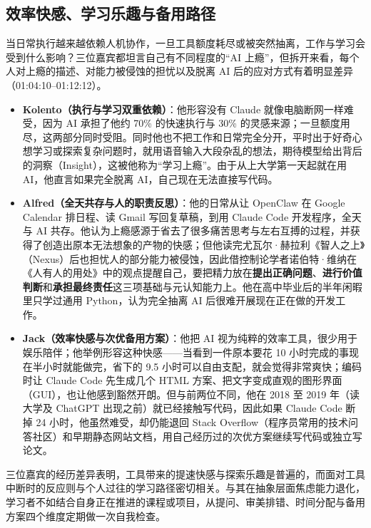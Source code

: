 \documentclass[UTF8,a4paper,11pt,fontset=fandol]{ctexart}
\begin{document}
\subsection{效率快感、学习乐趣与备用路径}
当日常执行越来越依赖人机协作，一旦工具额度耗尽或被突然抽离，工作与学习会受到什么影响？三位嘉宾都坦言自己有不同程度的“AI 上瘾”，但拆开来看，每个人对上瘾的描述、对能力被侵蚀的担忧以及脱离 AI 后的应对方式有着明显差异（01:04:10–01:12:12）。

\begin{itemize}
\item \textbf{Kolento（执行与学习双重依赖）}：他形容没有 Claude 就像电脑断网一样难受，因为 AI 承担了他约 70\% 的快速执行与 30\% 的灵感来源；一旦额度用尽，这两部分同时受阻。同时他也不把工作和日常完全分开，平时出于好奇心想学习或探索复杂问题时，就用语音输入大段杂乱的想法，期待模型给出背后的洞察（Insight），这被他称为“学习上瘾”。由于从上大学第一天起就在用 AI，他直言如果完全脱离 AI，自己现在无法直接写代码。
\item \textbf{Alfred（全天共存与人的职责反思）}：他的日常从让 OpenClaw 在 Google Calendar 排日程、读 Gmail 写回复草稿，到用 Claude Code 开发程序，全天与 AI 共存。他认为上瘾感源于省去了很多痛苦思考与左右互搏的过程，并获得了创造出原本无法想象的产物的快感；但他读完尤瓦尔·赫拉利《智人之上》（Nexus）后也担忧人的部分能力被侵蚀，因此借控制论学者诺伯特·维纳在《人有人的用处》中的观点提醒自己，要把精力放在\textbf{提出正确问题}、\textbf{进行价值判断}和\textbf{承担最终责任}这三项基础与元认知能力上。他在高中毕业后的半年闲暇里只学过通用 Python，认为完全抽离 AI 后很难开展现在正在做的开发工作。
\item \textbf{Jack（效率快感与次优备用方案）}：他把 AI 视为纯粹的效率工具，很少用于娱乐陪伴；他举例形容这种快感——当看到一件原本要花 10 小时完成的事现在半小时就能做完，省下的 9.5 小时可以自由支配，就会觉得非常爽快；编码时让 Claude Code 先生成几个 HTML 方案、把文字变成直观的图形界面（GUI），也让他感到豁然开朗。但与前两位不同，他在 2018 至 2019 年（读大学及 ChatGPT 出现之前）就已经接触写代码，因此如果 Claude Code 断掉 24 小时，他虽然难受，却仍能退回 Stack Overflow（程序员常用的技术问答社区）和早期静态网站文档，用自己经历过的次优方案继续写代码或独立写论文。
\end{itemize}

三位嘉宾的经历差异表明，工具带来的提速快感与探索乐趣是普遍的，而面对工具中断时的反应则与个人过往的学习路径密切相关。与其在抽象层面焦虑能力退化，学习者不如结合自身正在推进的课程或项目，从提问、审美排错、时间分配与备用方案四个维度定期做一次自我检查。
\end{document}
